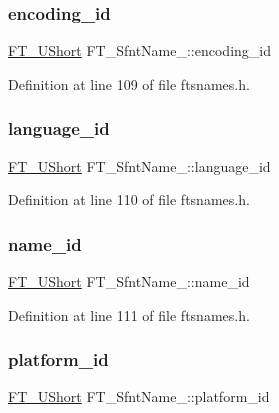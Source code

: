 \subsubsection{\texorpdfstring{encoding\_id}{encoding\_id}}
{\footnotesize\ttfamily \mbox{\hyperlink{fttypes_8h_a937f6c17cf5ffd09086d8610c37b9f58}{F\+T\+\_\+\+U\+Short}} F\+T\+\_\+\+Sfnt\+Name\+\_\+\+::encoding\+\_\+id}



Definition at line 109 of file ftsnames.\+h.

\mbox{\label{struct_f_t___sfnt_name___a6fb23e0f299a97b25b63805b04cf1fc5}} 
\subsubsection{\texorpdfstring{language\_id}{language\_id}}
{\footnotesize\ttfamily \mbox{\hyperlink{fttypes_8h_a937f6c17cf5ffd09086d8610c37b9f58}{F\+T\+\_\+\+U\+Short}} F\+T\+\_\+\+Sfnt\+Name\+\_\+\+::language\+\_\+id}



Definition at line 110 of file ftsnames.\+h.

\mbox{\label{struct_f_t___sfnt_name___ac07be3e852408990fe0a910f00b68f4e}} 
\subsubsection{\texorpdfstring{name\_id}{name\_id}}
{\footnotesize\ttfamily \mbox{\hyperlink{fttypes_8h_a937f6c17cf5ffd09086d8610c37b9f58}{F\+T\+\_\+\+U\+Short}} F\+T\+\_\+\+Sfnt\+Name\+\_\+\+::name\+\_\+id}



Definition at line 111 of file ftsnames.\+h.

\mbox{\label{struct_f_t___sfnt_name___ae92450a058eb4737df85f66226d69f43}} 
\subsubsection{\texorpdfstring{platform\_id}{platform\_id}}
{\footnotesize\ttfamily \mbox{\hyperlink{fttypes_8h_a937f6c17cf5ffd09086d8610c37b9f58}{F\+T\+\_\+\+U\+Short}} F\+T\+\_\+\+Sfnt\+Name\+\_\+\+::platform\+\_\+id}



